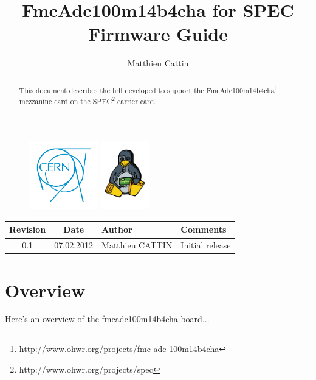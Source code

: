 \documentclass[11pt,a4paper]{article}
\title{FmcAdc100m14b4cha for SPEC \\
Firmware Guide}
\author{Matthieu Cattin}
\begin{document}
\begin{figure}[t]
  \includegraphics[height=3cm]{figures/cern_logo.pdf}
  \label{fig:cern_logo}
  \hfill
  \includegraphics[height=3cm]{figures/ohr_logo.pdf}
  \label{fig:ohr_logo}
\end{figure}

\maketitle

\begin{abstract}
This document describes the hdl developed to support the FmcAdc100m14b4cha\footnote{http://www.ohwr.org/projects/fmc-adc-100m14b4cha} mezzanine card on the SPEC\footnote{http://www.ohwr.org/projects/spec} carrier card.
\end{abstract}


\newpage
\begin{tabularx}{1.0\textwidth}{| c | c | l | X |}
\hline
Revision & Date & Author &  Comments\\
\hline
0.1 & 07.02.2012 & Matthieu CATTIN & Initial release\\
\hline
\end{tabularx}

\newpage
\tableofcontents

\newpage

\section{Overview}
Here's an overview of the fmcadc100m14b4cha board...
\end{document}
